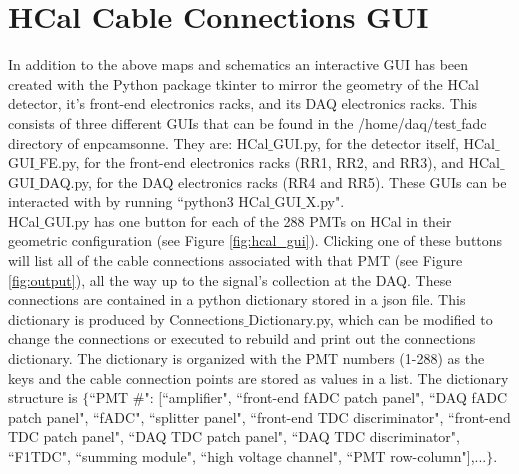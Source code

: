 \documentclass[oneside]{book}   %
\begin{document}
%

\section{HCal Cable Connections GUI}
\label{sec:gui}

In addition to the above maps and schematics an interactive GUI has been created with the Python package tkinter to mirror the geometry of the HCal detector, it's front-end electronics racks, and its DAQ electronics racks. This consists of three different GUIs that can be found in the /home/daq/test$\_$fadc directory of enpcamsonne. They are: HCal$\_$GUI.py, for the detector itself, HCal$\_$GUI$\_$FE.py, for the front-end electronics racks (RR1, RR2, and RR3), and HCal$\_$GUI$\_$DAQ.py, for the DAQ electronics racks (RR4 and RR5). These GUIs can be interacted with by running ``python3 HCal$\_$GUI$\_$X.py". \\

HCal$\_$GUI.py has one button for each of the 288 PMTs on HCal in their geometric configuration (see Figure \ref{fig:hcal_gui}). Clicking one of these buttons will list all of the cable connections associated with that PMT (see Figure \ref{fig:output}), all the way up to the signal's collection at the DAQ. These connections are contained in a python dictionary stored in a json file. This dictionary is produced by Connections$\_$Dictionary.py, which can be modified to change the connections or executed to rebuild and print out the connections dictionary. The dictionary is organized with the PMT numbers (1-288) as the keys and the cable connection points are stored as values in a list. The dictionary structure is $\{$``PMT \#": [``amplifier", ``front-end fADC patch panel", ``DAQ fADC patch panel", ``fADC", ``splitter panel", ``front-end TDC discriminator", ``front-end TDC patch panel", ``DAQ TDC patch panel", ``DAQ TDC discriminator", ``F1TDC", ``summing module", ``high voltage channel", ``PMT row-column"],...$\}$.\\
\end{document}

